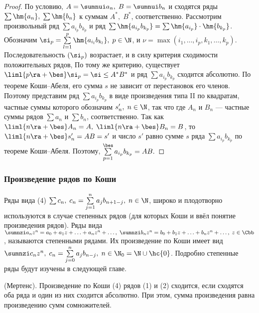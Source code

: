 \documentclass[a4paper]{article}
\begin{document}
\begin{proof}
По условию, $A=\sumnui a_n, \; B=\sumnui b_n$ и сходятся ряды
$\sum\hm{a_n}, \; \sum\hm{b_n}$ к суммам $A^*, \; B^*$,
соответственно. Рассмотрим произвольный ряд $\sum a_{i_p} b_{k_p}$ и
ряд $\sum \hm{a_{i_p} b_{k_p}}=\sum\hm{a_{i_p}}\cdot\hm{b_{k_p}}$.
Обозначим $\si_p=\sum\limits_{l=1}^p \hm{a_{i_l}b_{k_l}}, \;
p\in\N$, и $\nu=\max(i_1,\ldots,i_p,k_1,\ldots,k_p)$.
Последовательность $(\si_p)$ возрастает, и в силу критерия
сходимости положительных рядов,  По тому же критерию, существует
$\liml{p\ra+\bes}\si_p = \si \le A^*B^*$ и ряд $\sum a_{i_p}b_{k_p}$
сходится абсолютно. По теореме Коши--Абеля, его сумма $s$ не зависит
от перестановок его членов. Поэтому представим ряд $\sum
a_{i_p}b_{k_p}$ в виде произведения типа II по квадратам, частные
суммы которого обозначим $s'_n, \; n\in\N$, так что  где
$A_n$ и $B_n$ --- частные суммы рядов $\sum a_n$ и $\sum b_n$,
соответственно. Так как $\liml{n\ra+\bes}A_n=A, \;
\liml{n\ra+\bes}B_n=B$, то $\liml{n\ra+\bes}s'_n=AB=s'$ и число $s'$
равно сумме $s$ ряда $\sum a_{i_p}b_{k_p}$ по теореме Коши--Абеля.
Поэтому, $\sum\limits_{p=1}^{\bes} a_{i_p}b_{k_p}=AB.$
\end{proof}

\subsubsection{Произведение рядов по Коши}

Ряды вида (4) $\sum c_n, \; c_n=\sum\limits_{j=1}^n a_j b_{n+1-j},
\; n\in\N$, широко и плодотворно используются в случае степенных
рядов (для которых Коши и ввёл понятие произведения рядов). Ряды
вида $\sumnzi a_nz^n=a_0+a_1z+ \ldots + a_nz^n + \ldots, \; \sumnzi
b_nz^n = b_0+b_1z+\ldots+b_nz^n+\ldots, \; z\in\Cbb$, называются
степенными рядами. Их произведение по Коши имеет вид $\sumnzi
c_nz^n, \; c_n=\sum\limits_{j=0}^n a_j b_{n-j}, \; n\in\N_0 =
\N\cup\hc{0}$. Подробно степенные ряды будут изучены в следующей
главе.

\begin{theorem}
(Мертенс). Произведение по Коши (4) рядов (1) и (2) сходится, если
сходятся оба ряда и один из них сходится абсолютно. При этом, сумма
произведения равна произведению сумм сомножителей.
\end{theorem}
\end{document}
